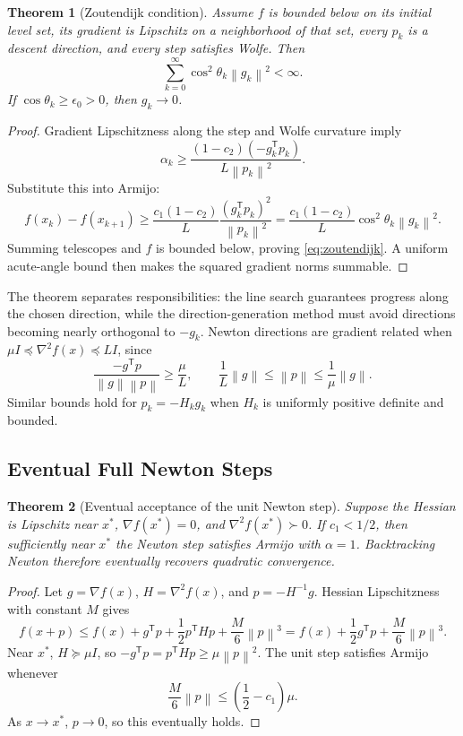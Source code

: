 \documentclass[12pt,oneside]{book}
\numberwithin{equation}{section}
\theoremstyle{definition}
\theoremstyle{plain}
\newtheorem{theorem}{Theorem}[section]
\theoremstyle{remark}
\newcommand{\norm}[1]{\left\lVert #1 \right\rVert}
\newcommand{\grad}{\nabla}
\newcommand{\Hess}{\nabla^2}
\begin{document}
\begin{theorem}[Zoutendijk condition]
Assume $f$ is bounded below on its initial level set, its gradient is
Lipschitz on a neighborhood of that set, every $p_k$ is a descent direction,
and every step satisfies Wolfe. Then
\begin{equation}
 \sum_{k=0}^\infty\cos^2\theta_k\norm{g_k}^2<\infty.
 \label{eq:zoutendijk}
\end{equation}
If $\cos\theta_k\geq\epsilon_0>0$, then $g_k\to0$.
\end{theorem}

\begin{proof}
Gradient Lipschitzness along the step and Wolfe curvature imply
\[
 \alpha_k\geq
 \frac{(1-c_2)(-g_k^\mathsf Tp_k)}{L\norm{p_k}^2}.
\]
Substitute this into Armijo:
\[
 f(x_k)-f(x_{k+1})
 \geq\frac{c_1(1-c_2)}L
 \frac{(g_k^\mathsf Tp_k)^2}{\norm{p_k}^2}
 =\frac{c_1(1-c_2)}L\cos^2\theta_k\norm{g_k}^2.
\]
Summing telescopes and $f$ is bounded below, proving
\cref{eq:zoutendijk}. A uniform acute-angle bound then makes the squared
gradient norms summable.
\end{proof}

The theorem separates responsibilities: the line search guarantees progress
along the chosen direction, while the direction-generation method must avoid
directions becoming nearly orthogonal to $-g_k$. Newton directions are
gradient related when
$\mu I\preceq\Hess f(x)\preceq LI$, since
\[
 \frac{-g^\mathsf Tp}{\norm g\norm p}\geq\frac\mu L,
 \qquad
 \frac1L\norm g\leq\norm p\leq\frac1\mu\norm g.
\]
Similar bounds hold for $p_k=-H_kg_k$ when $H_k$ is uniformly positive
definite and bounded.

\subsection{Eventual Full Newton Steps}

\begin{theorem}[Eventual acceptance of the unit Newton step]
Suppose the Hessian is Lipschitz near $x^*$,
$\grad f(x^*)=0$, and $\Hess f(x^*)\succ0$. If $c_1<1/2$, then sufficiently
near $x^*$ the Newton step satisfies Armijo with $\alpha=1$. Backtracking
Newton therefore eventually recovers quadratic convergence.
\end{theorem}

\begin{proof}
Let $g=\grad f(x)$, $H=\Hess f(x)$, and $p=-H^{-1}g$. Hessian Lipschitzness
with constant $M$ gives
\[
 f(x+p)\leq f(x)+g^\mathsf Tp+\frac12p^\mathsf THp
 +\frac M6\norm p^3
 =f(x)+\frac12g^\mathsf Tp+\frac M6\norm p^3.
\]
Near $x^*$, $H\succeq\mu I$, so
$-g^\mathsf Tp=p^\mathsf THp\geq\mu\norm p^2$. The unit step satisfies
Armijo whenever
\[
 \frac M6\norm p\leq\left(\frac12-c_1\right)\mu.
\]
As $x\to x^*$, $p\to0$, so this eventually holds.
\end{proof}
\end{document}
